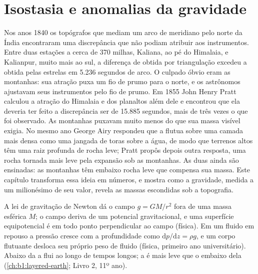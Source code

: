 \chapter{Isostasia e anomalias da gravidade}\label{ch:b1:isostasy-gravity}

Nos anos 1840 os topógrafos que mediam um arco de meridiano pelo norte da Índia
encontraram uma discrepância que não podiam atribuir aos instrumentos. Entre duas estações
a cerca de 370 milhas, Kaliana, ao pé do Himalaia, e Kalianpur, muito mais ao sul, a
diferença de  obtida por triangulação excedeu a obtida pelas estrelas em
5.236 segundos de arco. O culpado óbvio eram as montanhas: sua atração puxa um fio de prumo para o norte, e os
astrônomos ajustavam seus instrumentos pelo fio de prumo. Em 1855 John Henry Pratt
calculou a atração do Himalaia e dos planaltos além dele e
encontrou que ela deveria ter feito a discrepância ser de 15.885 segundos, mais de três
vezes o que foi observado. As montanhas puxavam muito menos do que sua massa visível
exigia. No mesmo ano George Airy respondeu que a  flutua sobre uma camada mais densa
como uma jangada de toras sobre a água, de modo que terrenos altos têm uma raiz profunda de
rocha leve; Pratt propôs depois outra resposta, uma rocha tornada mais leve pela
expansão sob as montanhas. As duas ainda são ensinadas: as montanhas têm embaixo rocha leve que compensa
sua massa. Este capítulo transforma essa ideia em
números, e mostra como a gravidade, medida a um milionésimo de seu valor, revela as
massas escondidas sob a topografia.

\begin{recall}
A lei de gravitação de Newton dá o campo $g = GM/r^2$ fora de uma massa esférica
$M$; o campo deriva de um potencial gravitacional, e uma superfície equipotencial é em todo
ponto perpendicular ao campo (física). Em um fluido em repouso a pressão cresce com a profundidade como $\mathrm dp/\mathrm dz = \rho g$, e um
corpo flutuante desloca seu próprio peso de fluido (física, primeiro ano universitário).
Abaixo da  a  flui ao longo de tempos longos; a  é mais leve que o  embaixo dela (\cref{ch:b1:layered-earth}; Livro 2, 11º ano).
\end{recall}

